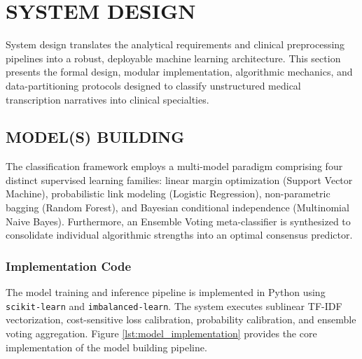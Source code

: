 \clearpage

\section{SYSTEM DESIGN}

System design translates the analytical requirements and clinical preprocessing pipelines into a robust, deployable machine learning architecture. This section presents the formal design, modular implementation, algorithmic mechanics, and data-partitioning protocols designed to classify unstructured medical transcription narratives into clinical specialties.

\subsection{MODEL(S) BUILDING}

The classification framework employs a multi-model paradigm comprising four distinct supervised learning families: linear margin optimization (Support Vector Machine), probabilistic link modeling (Logistic Regression), non-parametric bagging (Random Forest), and Bayesian conditional independence (Multinomial Naive Bayes). Furthermore, an Ensemble Voting meta-classifier is synthesized to consolidate individual algorithmic strengths into an optimal consensus predictor.

\subsubsection{Implementation Code}

The model training and inference pipeline is implemented in Python using \texttt{scikit-learn} and \texttt{imbalanced-learn}. The system executes sublinear TF-IDF vectorization, cost-sensitive loss calibration, probability calibration, and ensemble voting aggregation. Figure \ref{lst:model_implementation} provides the core implementation of the model building pipeline.

